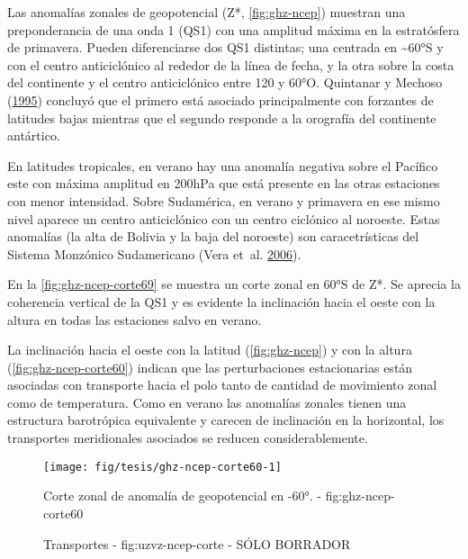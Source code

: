 \documentclass[spanish,a4paper]{book}
\begin{document}
Las anomalías zonales de geopotencial (Z*, \autoref{fig:ghz-ncep})
muestran una preponderancia de una onda 1 (QS1) con una amplitud máxima
en la estratósfera de primavera. Pueden diferenciarse dos QS1 distintas;
una centrada en \textasciitilde{}60°S y con el centro anticiclónico al
rededor de la línea de fecha, y la otra sobre la costa del continente y
el centro anticiclónico entre 120 y 60°O. Quintanar y Mechoso
(\protect\hyperlink{ref-Quintanar1995}{1995}) concluyó que el primero
está asociado principalmente con forzantes de latitudes bajas mientras
que el segundo responde a la orografía del continente antártico.

En latitudes tropicales, en verano hay una anomalía negativa sobre el
Pacífico este con máxima amplitud en 200hPa que está presente en las
otras estaciones con menor intensidad. Sobre Sudamérica, en verano y
primavera en ese mismo nivel aparece un centro anticiclónico con un
centro ciclónico al noroeste. Estas anomalías (la alta de Bolivia y la
baja del noroeste) son caracetrísticas del Sistema Monzónico
Sudamericano (Vera et~al. \protect\hyperlink{ref-Vera2006}{2006}).

En la \autoref{fig:ghz-ncep-corte69} se muestra un corte zonal en 60°S
de Z*. Se aprecia la coherencia vertical de la QS1 y es evidente la
inclinación hacia el oeste con la altura en todas las estaciones salvo
en verano.

La inclinación hacia el oeste con la latitud (\autoref{fig:ghz-ncep}) y
con la altura (\autoref{fig:ghz-ncep-corte60}) indican que las
perturbaciones estacionarias están asociadas con transporte hacia el
polo tanto de cantidad de movimiento zonal como de temperatura. Como en
verano las anomalías zonales tienen una estructura barotrópica
equivalente y carecen de inclinación en la horizontal, los transportes
meridionales asociados se reducen considerablemente. 

\begin{figure}

{\centering \texttt{[image: fig/tesis/ghz-ncep-corte60-1]} 

}

\caption{Corte zonal de anomalía de geopotencial en -60°. - fig:ghz-ncep-corte60}\label{fig:ghz-ncep-corte60}
\end{figure}

\begin{figure*}
\newline{}\caption{Transportes - fig:uzvz-ncep-corte - SÓLO BORRADOR}\label{fig:uzvz-ncep-corte}
\end{figure*}
\end{document}
